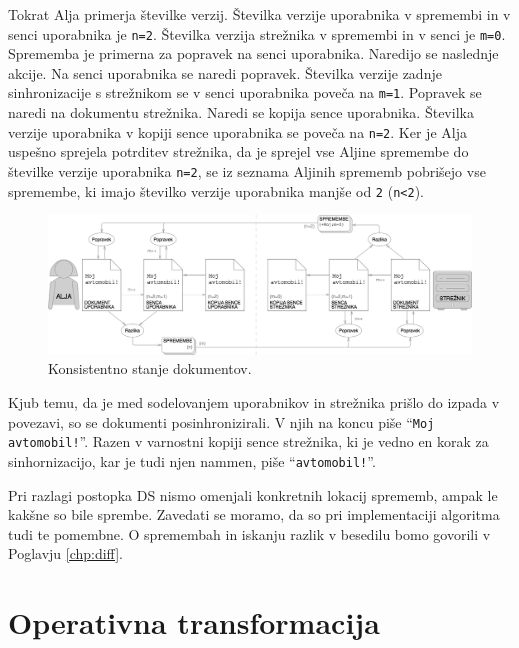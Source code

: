 \documentclass[a4paper, 12pt, twoside]{book}
\begin{document}
Tokrat Alja primerja številke verzij. Številka verzije uporabnika v spremembi in v senci uporabnika je {\tt n=2}. Številka verzija strežnika v spremembi in v senci je {\tt m=0}. Sprememba je primerna za popravek na senci uporabnika. Naredijo se naslednje akcije. Na senci uporabnika se naredi popravek. Številka verzije zadnje sinhronizacije s strežnikom se v senci uporabnika poveča na {\tt m=1}. Popravek se naredi na dokumentu strežnika. Naredi se kopija sence uporabnika. Številka verzije uporabnika v kopiji sence uporabnika se poveča na {\tt n=2}. Ker je Alja uspešno sprejela potrditev strežnika, da je sprejel vse Aljine spremembe do številke verzije uporabnika {\tt n=2}, se iz seznama Aljinih sprememb pobrišejo vse spremembe, ki imajo številko verzije uporabnika manjše od {\tt 2} ({\tt n<2}).

\begin{figure}[placement h]
\begin{center}
\includegraphics[width=16cm]{ds10.png}
\end{center}
\caption{Konsistentno stanje dokumentov.}
\label{ds10}
\end{figure}

Kjub temu, da je med sodelovanjem uporabnikov in strežnika prišlo do izpada v povezavi, so se dokumenti posinhronizirali. V njih na koncu piše “{\tt Moj avtomobil!}”. Razen v varnostni kopiji sence strežnika, ki je vedno en korak za sinhornizacijo, kar je tudi njen nammen, piše “{\tt avtomobil!}”.

Pri razlagi postopka DS nismo omenjali konkretnih lokacij sprememb, ampak le kakšne so bile sprembe. Zavedati se moramo, da so pri implementaciji algoritma tudi te pomembne. O spremembah in iskanju razlik v besedilu bomo govorili v Poglavju \ref{chp:diff}.

\newpage

\section{Operativna transformacija}
\label{sec:ot}
\end{document}
